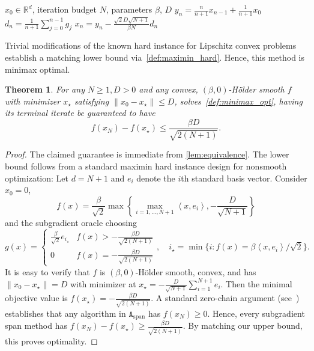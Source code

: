 \documentclass[11pt, hidelinks]{article}
\numberwithin{equation}{section}
\theoremstyle{thmstyletwo}%
\newtheorem{theorem}[thm]{Theorem}
\numberwithin{equation}{section}
\newcommand{\Holder}{H\"older }
\newcommand{\inner}[2]{\left\langle {#1}, {#2} \right\rangle}
\newcommand{\Algclass}[1]{\mathtt{A}_{\mathrm{{#1}}}}
\begin{document}
\begin{algorithm}
\caption{SSEP Method for $(\beta,0)$-\Holder Smooth Convex Minimization}
\begin{algorithmic}\label{alg:SSEP_BSD}
\Input $x_0 \in \mathbb{R}^d$, iteration budget $N$, parameters $\beta, \, D$
    \State $y_n = \frac{n}{n+1}x_{n-1} + \frac{1}{n+1}x_0$
    \State $d_n = \frac{1}{n+1}\sum_{j=0}^{n-1} g_j$
    \State $x_n = y_n - \frac{\sqrt{2}D\sqrt{N+1}}{\beta N} d_n$
\EndFor
\end{algorithmic}
\end{algorithm}

Trivial modifications of the known hard instance for Lipschitz convex problems establish a matching lower bound via~\eqref{def:maximin_hard}. Hence, this method is minimax optimal. 
\begin{theorem}\label{thm:minimax_BSFOM}
    For any $N\geq 1, D>0$ and any convex, $(\beta, 0)$-\Holder smooth $f$ with minimizer $x_\star$ satisfying $\|x_0-x_\star\| \leq D$,   solves~\eqref{def:minimax_opt}, having its terminal iterate be guaranteed to have
    $$f(x_N) - f(x_\star) \leq \frac{\beta D}{\sqrt{2(N+1)}}.$$
\end{theorem}
\begin{proof}
The claimed guarantee is immediate from \cref{lem:equivalence}. The lower bound follows from a standard maximin hard instance design for nonsmooth optimization: Let $d = N+1$ and $e_i$ denote the $i$th standard basis vector. Consider $x_0=0$,
$$ f(x) = \frac{\beta}{\sqrt{2}}\max\left\{\max_{i=1, \dots, N+1} \inner{x}{e_i}, -\frac{D}{\sqrt{N+1}}\right\} $$
and the subgradient oracle choosing $$
g(x) = \begin{cases}
\frac{\beta}{\sqrt{2}}e_{i_\star} & f(x) > -\frac{\beta D}{\sqrt{2(N+1)}}\\
0 & f(x) = -\frac{\beta D}{\sqrt{2(N+1)}}
\end{cases}, \quad i_\star = \min\{i : f(x) = \beta\inner{x}{e_i}/\sqrt{2}\}.$$
It is easy to verify that $f$ is $(\beta,0)$-\Holder smooth, convex, and has $\|x_0-x_\star\|=D$ with minimizer at $x_\star = -\frac{D}{\sqrt{N+1}}\sum_{i=1}^{N+1} e_i$. Then the minimal objective value is $f(x_\star) = -\frac{\beta D}{\sqrt{2(N+1)}}$. A standard zero-chain argument (see~\cite[Theorem A.1]{drori2016optimal}) establishes that any algorithm in $\Algclass{span}$ has $f(x_N) \geq 0$. Hence, every subgradient span method has $ f(x_N) - f(x_\star) \geq \frac{\beta D}{\sqrt{2(N+1)}}$. By matching our upper bound, this proves optimality.
\end{proof}
\end{document}
